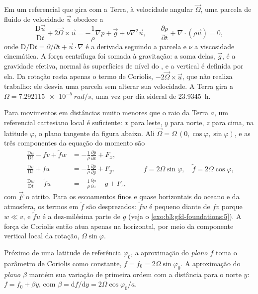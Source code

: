 Em um referencial que gira com a Terra, à velocidade angular
$\vec\Omega$, uma parcela de fluido de velocidade $\vec u$ obedece a
\[
\frac{\mathrm D\vec u}{\mathrm Dt} + 2\vec\Omega\times\vec u =
-\frac{1}{\rho}\nabla p + \vec g + \nu\nabla^2\vec u ,
\qquad
\frac{\partial\rho}{\partial t} + \nabla\cdot(\rho\vec u) = 0 ,
\]
onde $\mathrm D/\mathrm Dt = \partial/\partial t + \vec u\cdot\nabla$ é
a derivada seguindo a parcela e $\nu$ a viscosidade cinemática. A força
centrífuga foi somada à gravitação: a soma delas, $\vec g$, é a
gravidade efetiva, normal às superfícies de nível do , e
a vertical é definida por ela. Da rotação resta apenas o termo de Coriolis, $-2\vec\Omega\times
\vec u$, que não realiza trabalho: ele desvia uma parcela
sem alterar sua velocidade. A Terra gira a $\Omega =
\qty{7.292115e-5}{rad/s}$, uma vez por dia sideral de \qty{23.9345}{h}.

Para movimentos em distâncias muito menores que o raio da Terra $a$, um
referencial cartesiano local é suficiente: $x$ para leste, $y$ para norte, $z$ para
cima, na latitude $\varphi$, o plano tangente da figura abaixo. Ali
$\vec\Omega = \Omega\,(0, \cos\varphi, \sin\varphi)$, e as três
componentes da equação do momento são
\[
\begin{aligned}
\frac{\mathrm Du}{\mathrm Dt} - f v + \tilde f w &= -\frac{1}{\rho}\frac{\partial p}{\partial x} + F_x ,\\
\frac{\mathrm Dv}{\mathrm Dt} + f u &= -\frac{1}{\rho}\frac{\partial p}{\partial y} + F_y ,\\
\frac{\mathrm Dw}{\mathrm Dt} - \tilde f u &= -\frac{1}{\rho}\frac{\partial p}{\partial z} - g + F_z ,
\end{aligned}
\qquad f = 2\Omega\sin\varphi,\quad \tilde f = 2\Omega\cos\varphi ,
\]
com $\vec F$ o atrito. Para os escoamentos finos e quase horizontais do
oceano e da atmosfera, os termos em $\tilde f$ são desprezados: $\tilde f w$
é pequeno diante de $fv$ porque $w \ll v$, e $\tilde f u$ é a dez-milésima parte
de $g$ (veja o \cref{exo:b3:gfd-foundations:5}). A força de Coriolis então atua apenas
na horizontal, por meio da componente vertical local da rotação,
$\Omega\sin\varphi$.

\begin{definition}\label{def:b3:gfd-foundations:planes}
Próximo de uma latitude de referência $\varphi_0$, a aproximação do \emph{plano $f$}
toma o parâmetro de Coriolis como constante, $f = f_0 =
2\Omega\sin\varphi_0$. A aproximação do \emph{plano $\beta$}
mantém sua variação de primeira ordem com a distância para o norte $y$:
$f = f_0 + \beta y$, com $\beta = \mathrm df/\mathrm dy = 2\Omega
\cos\varphi_0/a$.
\end{definition}

